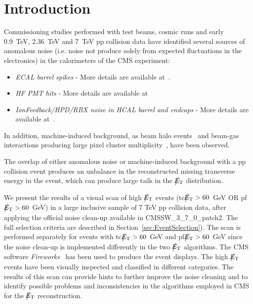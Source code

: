 \section{Introduction}

Commissioning studies performed with test beams, cosmic runs and 
early 0.9~TeV, 2.36~TeV and 7~TeV pp 
collision data have identified several sources of anomalous noise 
(i.e. noise not produce solely from expected fluctuations in the electronics)
in the calorimeters of the CMS experiment:
\begin{itemize}
\item {\it ECAL barrel spikes} - More details are available at~\cite{ECALAt7TeV}.

\item {\it HF PMT hits} - More details are available at~\cite{Chatrchyan:1225105,HFDN}

\item {\it IonFeedback/HPD/RBX noise in HCAL barrel and endcaps} - More details are available at~\cite{Chatrchyan:1225105,HCALWGNOTE}.
\end{itemize}
In addition, machine-induced background, as beam halo events~\cite{BEAMHALONOTE} 
and beam-gas interactions producing large pixel cluster multiplicity~\cite{TRKPAS2010}, have been observed. 

The overlap of either anomalous noise or machine-induced background 
with a pp collision event produces an unbalance in 
the reconstructed missing transverse energy in the event, which can produce 
large tails in the $\big\slash\hspace{-1.6ex}{E_\text{T}}$ distribution. 

We present the results of a visual scan of high $\big\slash\hspace{-1.6ex}{E_\text{T}}$ events 
(tc$\big\slash\hspace{-1.6ex}{E_\text{T}}>60$~GeV OR pf$\big\slash\hspace{-1.6ex}{E_\text{T}}>60$~GeV)
in a large inclusive sample of 7 TeV pp collision data, 
after applying the official noise clean-up available in CMSSW\_3\_7\_0\_patch2.
The full selection criteria are described in Section~\ref{sec:EventSelection}). 
The scan is performed separately for events with tc$\big\slash\hspace{-1.6ex}{E_\text{T}}>60$~GeV and pf$\big\slash\hspace{-1.6ex}{E_\text{T}}>60$~GeV
since the noise clean-up is implemented differently in the two $\big\slash\hspace{-1.6ex}{E_\text{T}}$ algorithms.
The CMS software {\it Fireworks}~\cite{FireworksLink} has been used to produce the event displays. 
The high $\big\slash\hspace{-1.6ex}{E_\text{T}}$ events have been visually inspected and classified in different 
categories. The results of this scan can provide hints to further improve the noise 
cleaning and to identify possible problems and inconsistencies in the algorithms employed 
in CMS for the $\big\slash\hspace{-1.6ex}{E_\text{T}}$ reconstruction.

